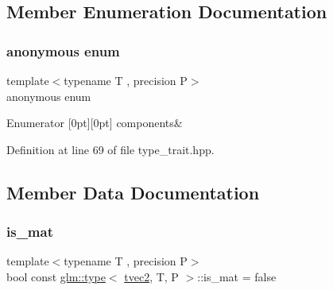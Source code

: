 \subsection{Member Enumeration Documentation}
\mbox{\label{structglm_1_1type_3_01tvec2_00_01_t_00_01_p_01_4_a2c93c2759a954a2de21fe375f1558f34}} 
\subsubsection{\texorpdfstring{anonymous enum}{anonymous enum}}
{\footnotesize\ttfamily template$<$typename T , precision P$>$ \\
anonymous enum}

\begin{DoxyEnumFields}{Enumerator}
[0pt][0pt]{}\mbox{\label{structglm_1_1type_3_01tvec2_00_01_t_00_01_p_01_4_a2c93c2759a954a2de21fe375f1558f34a71937c03f8888388dd6872cbdaa79196}} 
components&\\
\hline

\end{DoxyEnumFields}


Definition at line 69 of file type\+\_\+trait.\+hpp.



\subsection{Member Data Documentation}
\mbox{\label{structglm_1_1type_3_01tvec2_00_01_t_00_01_p_01_4_ae7f076df719e4dc42c5ca75b0255859d}} 
\subsubsection{\texorpdfstring{is\_mat}{is\_mat}}
{\footnotesize\ttfamily template$<$typename T , precision P$>$ \\
bool const \mbox{\hyperlink{structglm_1_1type}{glm\+::type}}$<$ \mbox{\hyperlink{structglm_1_1tvec2}{tvec2}}, T, P $>$\+::is\+\_\+mat = false\hspace{0.3cm}{\ttfamily [static]}}



